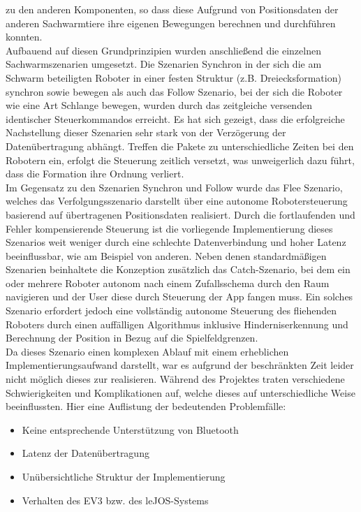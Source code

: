 zu den anderen Komponenten, so dass diese Aufgrund von Positionsdaten der anderen Sachwarmtiere 
ihre eigenen Bewegungen berechnen und durchführen konnten.
\\
Aufbauend auf diesen Grundprinzipien wurden anschließend die einzelnen Sachwarmszenarien 
umgesetzt. Die Szenarien Synchron in der sich die am Schwarm beteiligten Roboter in einer festen Struktur (z.B. Dreiecksformation) synchron sowie bewegen als auch das Follow Szenario, bei der 
sich die Roboter wie eine Art Schlange bewegen, wurden durch das zeitgleiche versenden identischer Steuerkommandos erreicht. Es hat sich gezeigt, dass die erfolgreiche Nachstellung dieser 
Szenarien sehr stark von der Verzögerung der Datenübertragung abhängt. Treffen die Pakete zu unterschiedliche Zeiten bei den Robotern ein, erfolgt die Steuerung zeitlich versetzt, was 
unweigerlich dazu führt, dass die Formation ihre Ordnung verliert.
\\
Im Gegensatz zu den Szenarien Synchron und Follow wurde das Flee Szenario, welches das Verfolgungsszenario darstellt über eine autonome Robotersteuerung basierend auf übertragenen
Positionsdaten realisiert. Durch die fortlaufenden und Fehler kompensierende Steuerung ist die
vorliegende Implementierung dieses Szenarios weit weniger durch eine schlechte Datenverbindung 
und hoher Latenz beeinflussbar, wie am Beispiel von anderen.
\medskip
\newline
Neben denen standardmäßigen Szenarien beinhaltete die Konzeption zusätzlich das Catch-Szenario, bei dem ein oder mehrere Roboter autonom nach einem Zufallsschema durch den Raum navigieren und der User diese durch Steuerung der App fangen muss. Ein solches Szenario erfordert jedoch eine vollständig autonome Steuerung des fliehenden Roboters durch einen auffälligen Algorithmus inklusive Hinderniserkennung und Berechnung der Position in Bezug auf die Spielfeldgrenzen. \\
Da dieses Szenario einen komplexen Ablauf mit einem erheblichen Implementierungsaufwand darstellt, war es aufgrund der beschränkten Zeit leider nicht möglich dieses zur realisieren.
\bigskip
\newline
Während des Projektes traten verschiedene Schwierigkeiten und Komplikationen auf, welche dieses auf unterschiedliche Weise beeinflussten. Hier eine Auflistung der bedeutenden Problemfälle:

\begin{itemize}
	\item Keine entsprechende Unterstützung von Bluetooth
	\item Latenz der Datenübertragung
	\item Unübersichtliche Struktur der Implementierung
	\item Verhalten des EV3 bzw. des leJOS-Systems
\end{itemize}


